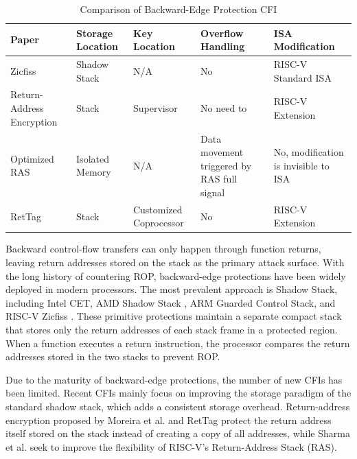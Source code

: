 \documentclass[journal,onecolumn]{IEEEtran}
\begin{document}
\begin{table}[t]
	\centering
	\caption{Comparison of Backward-Edge Protection CFI}
	\label{tab:backward-edge}
	\renewcommand{\arraystretch}{1.35}
	\setlength{\tabcolsep}{3.5pt}
	
	\begin{tabularx}{\columnwidth}{
			>{\raggedright\arraybackslash}p{}
			>{\centering\arraybackslash}p{}
			>{\centering\arraybackslash}p{}
			>{\centering\arraybackslash}p{}
			>{\raggedright\arraybackslash}X
		}
		\toprule
		\textbf{Paper} &
		\textbf{Storage Location} &
		\textbf{Key Location} &
		\textbf{Overflow Handling} &
		\textbf{ISA Modification} \\
		\midrule
		
		Zicfiss \cite{RISCVInstructionSet} &
		Shadow Stack&
		N/A&
		No&
		RISC-V Standard ISA\\
		
		Return-Address Encryption \cite{Moreira22} &
		Stack&
		Supervisor&
		No need to&
		RISC-V Extension\\[2pt]
		
		Optimized RAS \cite{Sharma25} &
		Isolated Memory&
		N/A&
		Data movement triggered by RAS full signal&
		No, modification is invisible to ISA\\[2pt]
		
		RetTag \cite{Wang22} &
		Stack&
		Customized Coprocessor&
		No&
		RISC-V Extension\\[2pt]
		
		\bottomrule
	\end{tabularx}
\end{table}
Backward control-flow transfers can only happen through function returns, leaving return addresses stored on the stack as the primary attack surface. With the long history of countering ROP, backward-edge protections have been widely deployed in modern processors. The most prevalent approach is Shadow Stack, including Intel CET\cite{TechnicalLookIntel}, AMD Shadow Stack \cite{InfinityGuard}, ARM Guarded Control Stack\cite{ArmArchitectureReference}, and RISC-V Zicfiss \cite{RISCVInstructionSet}. These primitive protections maintain a separate compact stack that stores only the return addresses of each stack frame in a protected region. When a function executes a return instruction, the processor compares the return addresses stored in the two stacks to prevent ROP.

Due to the maturity of backward-edge protections, the number of new CFIs has been limited. Recent CFIs mainly focus on improving the storage paradigm of the standard shadow stack, which adds a consistent storage overhead. Return-address encryption proposed by Moreira et al. \cite{Moreira22} and RetTag \cite{Wang22} protect the return address itself stored on the stack instead of creating a copy of all addresses, while Sharma et al. \cite{Sharma25} seek to improve the flexibility of RISC-V's Return-Address Stack (RAS).
\end{document}
